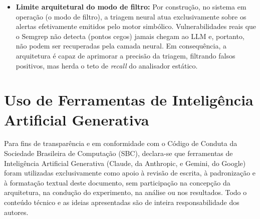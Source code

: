 \begin{itemize}

\item \textbf{Limite arquitetural do modo de filtro:} Por construção, no sistema em operação (o modo de filtro), a triagem neural atua exclusivamente sobre os alertas efetivamente emitidos pelo motor simbólico. Vulnerabilidades reais que o Semgrep não detecta (pontos cegos) jamais chegam ao LLM e, portanto, não podem ser recuperadas pela camada neural. Em consequência, a arquitetura é capaz de aprimorar a precisão da triagem, filtrando falsos positivos, mas herda o teto de \textit{recall} do analisador estático.
\end{itemize}

\section{Uso de Ferramentas de Inteligência Artificial Generativa}
Para fins de transparência e em conformidade com o Código de Conduta da Sociedade Brasileira de Computação (SBC), declara-se que ferramentas de Inteligência Artificial Generativa (Claude, da Anthropic, e Gemini, do Google) foram utilizadas exclusivamente como apoio à revisão de escrita, à padronização e à formatação textual deste documento, sem participação na concepção da arquitetura, na condução do experimento, na análise ou nos resultados. Todo o conteúdo técnico e as ideias apresentadas são de inteira responsabilidade dos autores.
